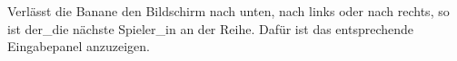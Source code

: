 Verlässt die Banane den Bildschirm nach unten, nach links oder nach rechts, so ist der\_die nächste Spieler\_in an der Reihe. Daf\"ur ist das entsprechende Eingabepanel anzuzeigen.